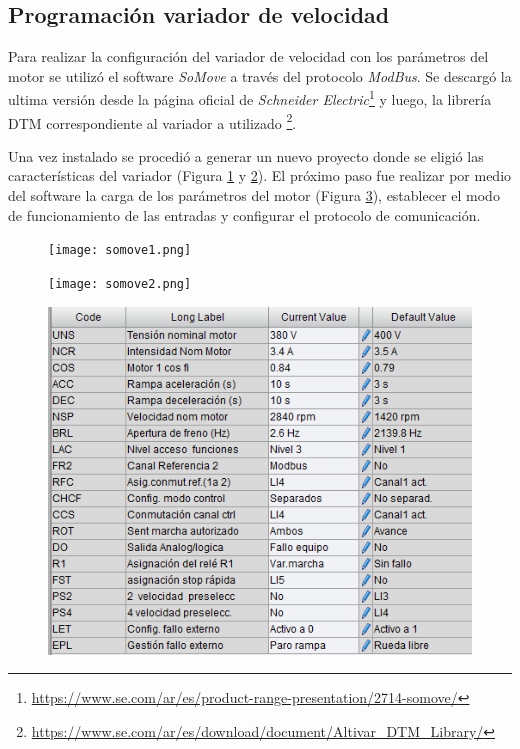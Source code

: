 
\subsection{Programación variador de velocidad}


Para realizar la configuración del variador de velocidad con los parámetros del motor se utilizó el software \textit{SoMove} a través del protocolo \textit{ModBus}. Se descargó la ultima versión desde la página oficial de \textit{Schneider Electric}\footnote{\url{https://www.se.com/ar/es/product-range-presentation/2714-somove/}} y luego, la librería DTM correspondiente al variador a utilizado \footnote{\url{https://www.se.com/ar/es/download/document/Altivar_DTM_Library/}}.

Una vez instalado se procedió a generar un nuevo proyecto donde se eligió las características del variador (Figura \ref{fig:so1} y \ref{fig:so2}). El próximo paso fue realizar por medio del software la carga de los parámetros del motor (Figura \ref{fig:paramsomove}), establecer el modo de funcionamiento de las entradas y configurar el protocolo de comunicación.
\begin{figure}[h]
	\centering
	\texttt{[image: somove1.png]}
	\label{fig:so1}
\end{figure}
\begin{figure}[H]
	\centering
	\texttt{[image: somove2.png]}
	\label{fig:so2}
\end{figure}

\begin{figure}[H]
	\centering
	\includegraphics[width=0.7\linewidth]{images/paramsomove}
	\label{fig:paramsomove}
\end{figure}


